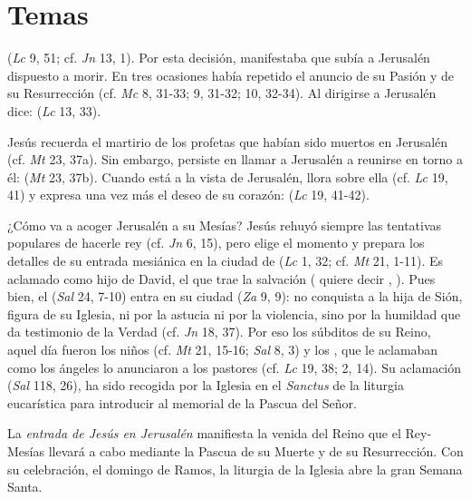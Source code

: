 \newsection
\section{Temas}


\begin{ccebody}

  (\textit{Lc} 9, 51; cf. \textit{Jn} 13, 1). Por esta decisión, manifestaba que subía a Jerusalén dispuesto a morir. En tres ocasiones había repetido el anuncio de su Pasión y de su Resurrección (cf. \textit{Mc} 8, 31-33; 9, 31-32; 10, 32-34). Al dirigirse a Jerusalén dice:  (\textit{Lc} 13, 33).

 Jesús recuerda el martirio de los profetas que habían sido muertos en Jerusalén (cf. \textit{Mt} 23, 37a). Sin embargo, persiste en llamar a Jerusalén a reunirse en torno a él:  (\textit{Mt} 23, 37b). Cuando está a la vista de Jerusalén, llora sobre ella (cf. \textit{Lc} 19, 41) y expresa una vez más el deseo de su corazón:  (\textit{Lc} 19, 41-42).


 ¿Cómo va a acoger Jerusalén a su Mesías? Jesús rehuyó siempre las tentativas populares de hacerle rey (cf. \textit{Jn} 6, 15), pero elige el momento y prepara los detalles de su entrada mesiánica en la ciudad de  (\textit{Lc} 1, 32; cf. \textit{Mt} 21, 1-11). Es aclamado como hijo de David, el que trae la salvación ( quiere decir , ). Pues bien, el  (\textit{Sal} 24, 7-10) entra en su ciudad  (\textit{Za} 9, 9): no conquista a la hija de Sión, figura de su Iglesia, ni por la astucia ni por la violencia, sino por la humildad que da testimonio de la Verdad (cf. \textit{Jn} 18, 37). Por eso los súbditos de su Reino, aquel día fueron los niños (cf. \textit{Mt} 21, 15-16; \textit{Sal} 8, 3) y los , que le aclamaban como los ángeles lo anunciaron a los pastores (cf. \textit{Lc} 19, 38; 2, 14). Su aclamación  (\textit{Sal} 118, 26), ha sido recogida por la Iglesia en el \textit{Sanctus} de la liturgia eucarística para introducir al memorial de la Pascua del Señor.

 La \textit{entrada de Jesús en Jerusalén} manifiesta la venida del Reino que el Rey-Mesías llevará a cabo mediante la Pascua de su Muerte y de su Resurrección. Con su celebración, el domingo de Ramos, la liturgia de la Iglesia abre la gran Semana Santa.
\end{ccebody}

